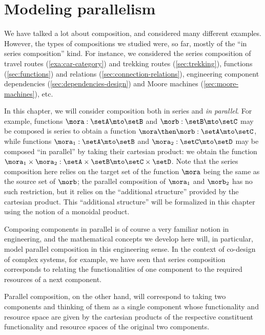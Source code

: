 

\section{Modeling parallelism}
\label{sec:modeling-parallelism}



We have talked a lot about composition, and considered many different examples. However, the types of compositions we studied were, so far, mostly of the ``in series composition'' kind. For instance, we considered the series composition of travel routes (\cref{exa:car-category}) and trekking routes (\cref{sec:trekking}), functions (\cref{sec:functions}) and relations (\cref{sec:connection-relations}), engineering component dependencies (\cref{sec:dependencies-design}) and Moore machines (\cref{sec:moore-machines}), etc. 


In this chapter, we will consider composition both in series and \emph{in parallel}. For example, functions $\mora: \setA \mto \setB$ and $\morb: \setB \mto \setC$ may be composed is series to obtain a function $\mora \then \morb: \setA \mto \setC$, while functions $\mora_1 : \setA \mto \setB$ and $\mora_2 : \setC \mto \setD$ may be composed ``in parallel'' by taking their cartesian product: we obtain the function $\mora_1 \times \mora_2: \setA \times \setB \mto \setC \times \setD$. Note that the series composition here relies on the target set of the function $\mora$ being the same as the source set of $\morb$; the parallel composition of $\mora_1$ and $\morb_2$ has no such restriction, but it relies on the ``additional structure'' provided by the cartesian product. This ``additional structure'' will be formalized in this chapter using the notion of a monoidal product. 

Composing components in parallel is of course a very familiar notion in engineering, and the mathematical concepts we develop here will, in particular, model parallel composition in this engineering sense. In the context of co-design of complex systems, for example, we have seen that series composition corresponds to relating the functionalities of one component to the required resources of a next component. 


Parallel composition, on the other hand, will correspond to taking two components and thinking of them as a single component whose functionality and resource space are given by the cartesian products of the respective constituent functionality and resource spaces of the original two components. 



